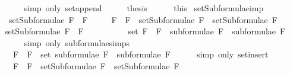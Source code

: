 \begin{isabellebody}
\ \ \ \ \isamarkupfalse%
\ {\isacharparenleft}simp\ only{\isacharcolon}\ set{\isacharunderscore}append{\isacharparenright}\isanewline
\ \ \isamarkupfalse%
\ \isamarkupfalse%
\ {\isacharquery}thesis\isanewline
\ \ \ \ \isamarkupfalse%
\ this\isanewline
{}\isamarkupfalse%
%
\endisatagproof
{\isafoldproof}%
%
\isadelimproof
\isanewline
%
\endisadelimproof
\isanewline
{}\isamarkupfalse%
\ setSubformulae{\isacharunderscore}imp{\isacharcolon}\ \isanewline
\ \ {\isachardoublequoteopen}setSubformulae\ {\isacharparenleft}F{}\ \isactrlbold {\isasymrightarrow}\ F{}{\isacharparenright}\ \isanewline
\ \ \ {\isacharequal}\ {\isacharbraceleft}F{}\ \isactrlbold {\isasymrightarrow}\ F{}{\isacharbraceright}\ {\isasymunion}\ {\isacharparenleft}setSubformulae\ F{}\ {\isasymunion}\ setSubformulae\ F{}{\isacharparenright}{\isachardoublequoteclose}\isanewline
%
\isadelimproof
%
\endisadelimproof
%
\isatagproof
{}\isamarkupfalse%
\ {\isacharminus}\isanewline
\ \ \isamarkupfalse%
\ {\isachardoublequoteopen}setSubformulae\ {\isacharparenleft}F{}\ \isactrlbold {\isasymrightarrow}\ F{}{\isacharparenright}\ \isanewline
\ \ \ \ \ \ \ \ {\isacharequal}\ set\ {\isacharparenleft}{\isacharparenleft}F{}\ \isactrlbold {\isasymrightarrow}\ F{}{\isacharparenright}\ {\isacharhash}\ {\isacharparenleft}subformulae\ F{}\ {\isacharat}\ subformulae\ F{}{\isacharparenright}{\isacharparenright}{\isachardoublequoteclose}\isanewline
\ \ \ \ \isamarkupfalse%
\ {\isacharparenleft}simp\ only{\isacharcolon}\ subformulae{\isachardot}simps{\isacharparenleft}{}{\isacharparenright}{\isacharparenright}\isanewline
\ \ \isamarkupfalse%
\ \isamarkupfalse%
\ {\isachardoublequoteopen}{\isasymdots}\ {\isacharequal}\ {\isacharbraceleft}F{}\ \isactrlbold {\isasymrightarrow}\ F{}{\isacharbraceright}\ {\isasymunion}\ {\isacharparenleft}set\ {\isacharparenleft}subformulae\ F{}\ {\isacharat}\ subformulae\ F{}{\isacharparenright}{\isacharparenright}{\isachardoublequoteclose}\isanewline
\ \ \ \ \isamarkupfalse%
\ {\isacharparenleft}simp\ only{\isacharcolon}\ set{\isacharunderscore}insert{\isacharparenright}\isanewline
\ \ \isamarkupfalse%
\ \isamarkupfalse%
\ {\isachardoublequoteopen}{\isasymdots}\ {\isacharequal}\ {\isacharbraceleft}F{}\ \isactrlbold {\isasymrightarrow}\ F{}{\isacharbraceright}\ {\isasymunion}\ {\isacharparenleft}setSubformulae\ F{}\ {\isasymunion}\ setSubformulae\ F{}{\isacharparenright}{\isachardoublequoteclose}\isanewline

\end{isabellebody}
